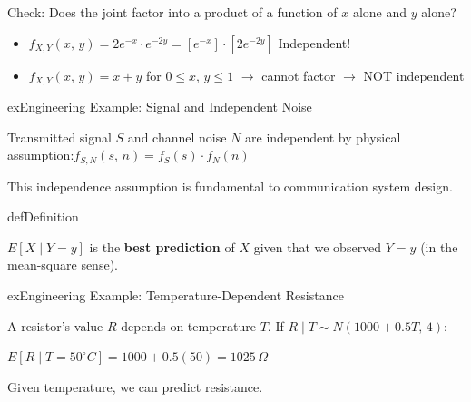 
Check: Does the joint factor into a product of a function of $x$ alone and $y$ alone?

\begin{itemize}
\tightlist
\item
  $f_{X,Y}(x,\,y) = 2e^{-x} \cdot e^{-2y} = [e^{-x}] \cdot [2e^{-2y}]$ \PSyes{} Independent!
\item
  $f_{X,Y}(x,\,y) = x + y$ for $0 \le x,\,y \le 1$ \ensuremath{\to} cannot factor \ensuremath{\to} NOT independent
\end{itemize}

\begin{PSbox}[unbreakable]{ex}{Engineering Example: Signal and Independent Noise}

Transmitted signal $S$ and channel noise $N$ are independent by physical assumption:\PSbr{}$f_{S,N}(s,\,n) = f_{S}(s) \cdot f_{N}(n)$

This independence assumption is fundamental to communication system design.

\end{PSbox}


\begin{PSbox}[unbreakable]{def}{Definition}


\end{PSbox}


$E[X \mid Y = y]$ is the \textbf{best prediction} of $X$ given that we observed $Y = y$ (in the mean-square sense).

\begin{PSbox}[unbreakable]{ex}{Engineering Example: Temperature-Dependent Resistance}

A resistor’s value $R$ depends on temperature $T$. If $R \mid T \sim N(1000 + 0.5T,\, 4)$:

$E[R \mid T = 50^{\circ}C] = 1000 + 0.5(50) = 1025\,\Omega$

Given temperature, we can predict resistance.

\end{PSbox}

